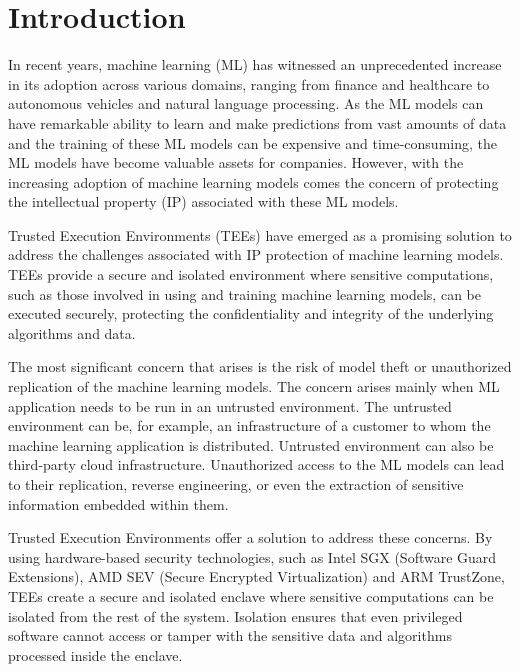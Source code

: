 \chapter{Introduction} \label{Introduction}

In recent years, machine learning (ML) has witnessed an unprecedented increase in its adoption across various domains, ranging from finance and healthcare to autonomous vehicles and natural language processing. As the ML models can have remarkable ability to learn and make predictions from vast amounts of data and the training of these ML models can be expensive and time-consuming, the ML models have become valuable assets for companies. However, with the increasing adoption of machine learning models comes the concern of protecting the intellectual property (IP) associated with these ML models.

Trusted Execution Environments (TEEs) have emerged as a promising solution to address the challenges associated with IP protection of machine learning models. TEEs provide a secure and isolated environment where sensitive computations, such as those involved in using and training machine learning models, can be executed securely, protecting the confidentiality and integrity of the underlying algorithms and data.

The most significant concern that arises is the risk of model theft or unauthorized replication of the machine learning models. The concern arises mainly when ML application needs to be run in an untrusted environment. The untrusted environment can be, for example, an infrastructure of a customer to whom the machine learning application is distributed. Untrusted environment can also be third-party cloud infrastructure. Unauthorized access to the ML models can lead to their replication, reverse engineering, or even the extraction of sensitive information embedded within them.\cite{ipofml}

Trusted Execution Environments offer a solution to address these concerns. By using hardware-based security technologies, such as Intel SGX (Software Guard Extensions), AMD SEV (Secure Encrypted Virtualization) and ARM TrustZone, TEEs create a secure and isolated enclave where sensitive computations can be isolated from the rest of the system. Isolation ensures that even privileged software cannot access or tamper with the sensitive data and algorithms processed inside the enclave.\cite{teeieee}

